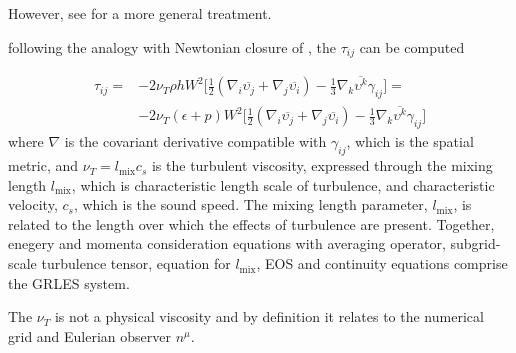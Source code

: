 However, see \citet{Carrasco:2019uzl,Vigano:2020ouc} for a more general treatment.

following the analogy with Newtonian closure of \cite{Smagorinsky:1963}, the $\tau_{ij}$ can be computed \cite{Radice:2017zta}

\begin{equation}
\begin{aligned}
\tau_{ij} = &-2\nu_T\rho h W^2\Big[ \frac{1}{2}(\nabla_i\overline{\upsilon_j} + \nabla_j\overline{\upsilon_i}) - \frac{1}{3}\nabla_k\overline{\upsilon^k}\gamma_{ij} \Big] = \\
&-2 \nu_T (\epsilon + p)W^2\Big[ \frac{1}{2} (\nabla_i\overline{\upsilon_j} + \nabla_j\overline{\upsilon_i}) - \frac{1}{3}\nabla_k\overline{\upsilon^k}\gamma_{ij} \Big]
\end{aligned}
\end{equation}
%
where $\nabla$ is the covariant derivative compatible with $\gamma_{ij}$, which is the spatial metric, 
and $\nu_T = l_{\text{mix}}c_s$ is the turbulent viscosity, expressed through the mixing length
$l_{\text{mix}}$, which is characteristic length scale of turbulence, and characteristic velocity, 
$c_s$, which is the sound speed.
%
%
%
%
The mixing length parameter, $l_{\text{mix}}$, is related to the length over 
which the effects of turbulence are present. 
%
Together, enegery and momenta consideration equations with averaging operator, 
subgrid-scale turbulence tensor, equation for $l_{\text{mix}}$, \ac{EOS} and continuity equations 
comprise the \ac{GRLES} system.
%

The $\nu_T$ is not a physical viscosity and by definition it relates to the numerical grid and 
Eulerian observer $n^{\mu}$. 


